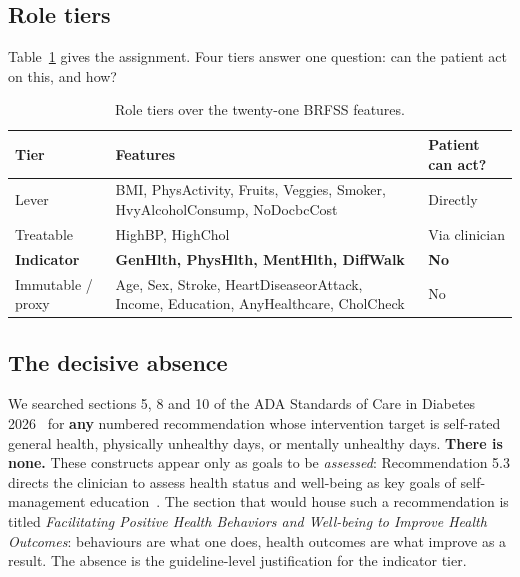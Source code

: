 \documentclass[conference]{IEEEtran}
\begin{document}
\subsection{Role tiers}
Table~\ref{tab:tiers} gives the assignment. Four tiers answer one question: can the patient act on this, and how?

\begin{table}[t]
\caption{Role tiers over the twenty-one BRFSS features.}
\label{tab:tiers}
\centering
\footnotesize
\begin{tabular}{@{}p{1.5cm}p{4.2cm}p{1.3cm}@{}}
\toprule
\textbf{Tier} & \textbf{Features} & \textbf{Patient can act?} \\
\midrule
Lever & BMI, PhysActivity, Fruits, Veggies, Smoker, HvyAlcoholConsump, NoDocbcCost & Directly \\
Treatable & HighBP, HighChol & Via clinician \\
\textbf{Indicator} & \textbf{GenHlth, PhysHlth, MentHlth, DiffWalk} & \textbf{No} \\
Immutable / proxy & Age, Sex, Stroke, HeartDiseaseorAttack, Income, Education, AnyHealthcare, CholCheck & No \\
\bottomrule
\end{tabular}
\end{table}

\subsection{The decisive absence}
We searched sections 5, 8 and 10 of the ADA Standards of Care in Diabetes 2026~\cite{ada2026s5,ada2026s8,ada2026s10} for \textbf{any} numbered recommendation whose intervention target is self-rated general health, physically unhealthy days, or mentally unhealthy days. \textbf{There is none.} These constructs appear only as goals to be \emph{assessed}: Recommendation 5.3 directs the clinician to assess health status and well-being as key goals of self-management education~\cite{ada2026s5}. The section that would house such a recommendation is titled \emph{Facilitating Positive Health Behaviors and Well-being to Improve Health Outcomes}: behaviours are what one does, health outcomes are what improve as a result. The absence is the guideline-level justification for the indicator tier.
\end{document}
